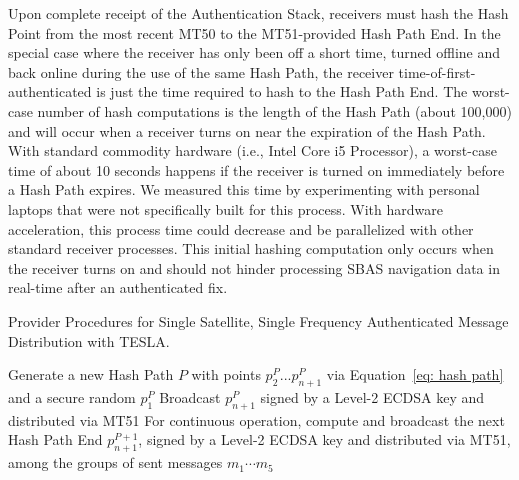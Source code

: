 \documentclass[letterpaper,times]{IONconf/IONconf}
\begin{document}
		Upon complete receipt of the Authentication Stack, receivers must hash the Hash Point from the most recent MT50 to the MT51-provided Hash Path End.
		In the special case where the receiver has only been off a short time, turned offline and back online during the use of the same Hash Path, the receiver time-of-first-authenticated is just the time required to hash to the Hash Path End.
		The worst-case number of hash computations is the length of the Hash Path (about 100,000) and will occur when a receiver turns on near the expiration of the Hash Path.
		With standard commodity hardware (i.e., Intel Core i5 Processor), a worst-case time of about 10 seconds happens if the receiver is turned on immediately before a Hash Path expires.
		We measured this time by experimenting with personal laptops that were not specifically built for this process.
		With hardware acceleration, this process time could decrease and be parallelized with other standard receiver processes.
		This initial hashing computation only occurs when the receiver turns on and should not hinder processing SBAS navigation data in real-time after an authenticated fix.

		\begin{algorithm}%
			\caption{Provider Procedures for Single Satellite, Single Frequency Authenticated Message Distribution with TESLA.}
			\label{alg: TESLA provider}
			\SetAlgoLined
			Generate a new Hash Path $P$ with points $p^P_2 ... p^P_{n+1}$ via Equation~\eqref{eq: hash path} and a secure random $p^P_1$\;
			Broadcast $p^P_{n+1}$ signed by a Level-2 ECDSA key and distributed via MT51\;
			For continuous operation, compute and broadcast the next Hash Path End $p^{P+1}_{n+1}$, signed by a Level-2 ECDSA key and distributed via MT51, among the groups of sent messages $m_1 \cdots m_5$\;
		\end{algorithm}
\end{document}
